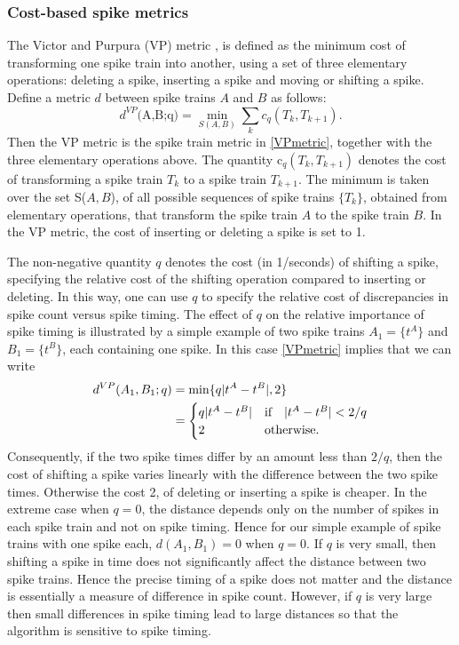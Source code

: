 \subsubsection{Cost-based spike metrics}
The Victor and Purpura (VP) metric \cite{Victor1996, Victor1998}, is defined as the minimum cost of transforming one spike train into another, using a set of three elementary operations:
deleting a spike, inserting a spike and moving or shifting a spike. Define a metric $d$ between spike trains $A$ and $B$ as follows:
\begin{equation}\label{VPmetric}
\text{$d^{VP}$(A,B;q)} = \displaystyle \min_{S(A,B)} \sum_{k} c_{q}(T_{k}, T_{k+1}). 
\end{equation} 
Then the VP metric is the spike train metric in \eqref{VPmetric}, together with the three elementary operations above.
The quantity c$_{q}(T_{k},T_{k+1})$ denotes the cost of transforming a spike train $T_{k}$ to a spike train $T_{k+1}$. The minimum is taken over the set S($A,B$), of all possible sequences of spike trains $\{T_{k}\}$, obtained from elementary operations, that transform the spike train $A$ to the spike train $B$.
In the VP metric, the cost of inserting or deleting a spike is set to 1.


The non-negative quantity $q$ denotes the cost (in 1/seconds) of shifting a spike, specifying the relative cost of the shifting operation compared to inserting or deleting. In this way, one can use $q$ to specify the relative cost of discrepancies in spike count versus spike timing.
The effect of $q$ on the relative importance of spike timing is illustrated by a simple example 
of two spike trains $A_1 = \{t^A\}$ and $B_1 = \{t^B\}$, each containing one spike.
In this case \eqref{VPmetric} implies that we can write 
\begin{align*}
d^{VP}(A_1,B_1;q) &= \displaystyle \min \{ q\lvert t^{A} - t^{B}\rvert,  2 \}\\
  &= \begin{cases} 
       q\lvert t^{A} - t^{B}\rvert & \text{if} \quad  \lvert t^{A} - t^{B}\rvert < 2/q \\
2 & \text{otherwise}.        
\end{cases}
\end{align*}
Consequently, if the two spike times differ by an amount less than $2/q$, then the cost of shifting a spike varies linearly with the difference between the two spike times. Otherwise
the cost 2, of deleting or inserting a spike is cheaper. In the extreme case when $q=0$, the distance depends only on the number of spikes in each spike train and not on spike timing.
Hence for our simple example of spike trains with one spike each, $d(A_1,B_1) = 0$ when $q = 0.$
If $q$ is very small, then shifting a spike in time does not significantly affect the distance between two spike trains. Hence the precise timing of a spike does not matter and the distance is
essentially a measure of difference in spike count.
However, if $q$ is very large then small differences in spike timing lead to large distances so that the algorithm is sensitive to spike timing.


